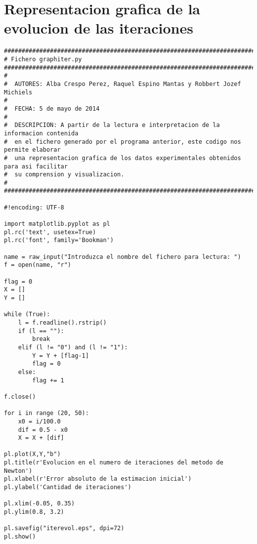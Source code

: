 \section{Representacion grafica de la evolucion de las iteraciones}
\label{Apendice2:label2}

\begin{center}
\begin{footnotesize}

\begin{verbatim}
#######################################################################################
# Fichero graphiter.py
#######################################################################################
#
#  AUTORES: Alba Crespo Perez, Raquel Espino Mantas y Robbert Jozef Michiels
#   
#  FECHA: 5 de mayo de 2014
#
#  DESCRIPCION: A partir de la lectura e interpretacion de la informacion contenida
#  en el fichero generado por el programa anterior, este codigo nos permite elaborar
#  una representacion grafica de los datos experimentales obtenidos para asi facilitar 
#  su comprension y visualizacion. 
#
#######################################################################################

#!encoding: UTF-8

import matplotlib.pyplot as pl
pl.rc('text', usetex=True)
pl.rc('font', family='Bookman')

name = raw_input("Introduzca el nombre del fichero para lectura: ")
f = open(name, "r")

flag = 0
X = []
Y = []

while (True):
    l = f.readline().rstrip()
    if (l == ""):
        break
    elif (l != "0") and (l != "1"):
        Y = Y + [flag-1]
        flag = 0
    else:
        flag += 1

f.close()

for i in range (20, 50):
    x0 = i/100.0
    dif = 0.5 - x0
    X = X + [dif]

pl.plot(X,Y,"b")
pl.title(r'Evolucion en el numero de iteraciones del metodo de Newton') 
pl.xlabel(r'Error absoluto de la estimacion inicial')
pl.ylabel('Cantidad de iteraciones')

pl.xlim(-0.05, 0.35)
pl.ylim(0.8, 3.2)

pl.savefig("iterevol.eps", dpi=72)
pl.show()

\end{verbatim}


\end{footnotesize}
\end{center}
